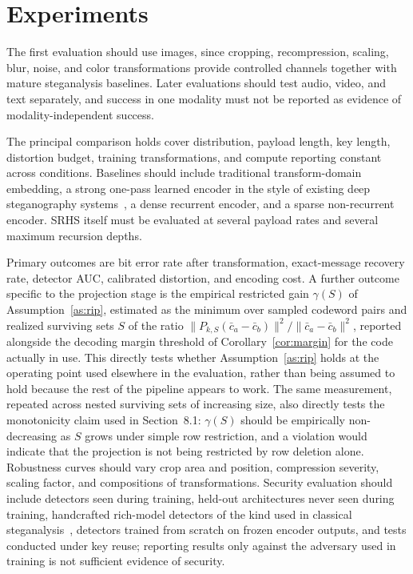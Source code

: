 \documentclass[11pt]{article}
\begin{document}
\section{Experiments}

The first evaluation should use images, since cropping, recompression, scaling, blur, noise, and color transformations provide controlled channels together with mature steganalysis baselines. Later evaluations should test audio, video, and text separately, and success in one modality must not be reported as evidence of modality-independent success.

The principal comparison holds cover distribution, payload length, key length, distortion budget, training transformations, and compute reporting constant across conditions. Baselines should include traditional transform-domain embedding, a strong one-pass learned encoder in the style of existing deep steganography systems~\cite{baluja2017,zhu2018hidden}, a dense recurrent encoder, and a sparse non-recurrent encoder. SRHS itself must be evaluated at several payload rates and several maximum recursion depths.

Primary outcomes are bit error rate after transformation, exact-message recovery rate, detector AUC, calibrated distortion, and encoding cost. A further outcome specific to the projection stage is the empirical restricted gain $\gamma(S)$ of Assumption~\ref{as:rip}, estimated as the minimum over sampled codeword pairs and realized surviving sets $S$ of the ratio $\|P_{k,S}(\bar c_a-\bar c_b)\|^2 / \|\bar c_a-\bar c_b\|^2$, reported alongside the decoding margin threshold of Corollary~\ref{cor:margin} for the code actually in use. This directly tests whether Assumption~\ref{as:rip} holds at the operating point used elsewhere in the evaluation, rather than being assumed to hold because the rest of the pipeline appears to work. The same measurement, repeated across nested surviving sets of increasing size, also directly tests the monotonicity claim used in Section~8.1: $\gamma(S)$ should be empirically non-decreasing as $S$ grows under simple row restriction, and a violation would indicate that the projection is not being restricted by row deletion alone. Robustness curves should vary crop area and position, compression severity, scaling factor, and compositions of transformations. Security evaluation should include detectors seen during training, held-out architectures never seen during training, handcrafted rich-model detectors of the kind used in classical steganalysis~\cite{fridrichkodovsky2012}, detectors trained from scratch on frozen encoder outputs, and tests conducted under key reuse; reporting results only against the adversary used in training is not sufficient evidence of security.
\end{document}
